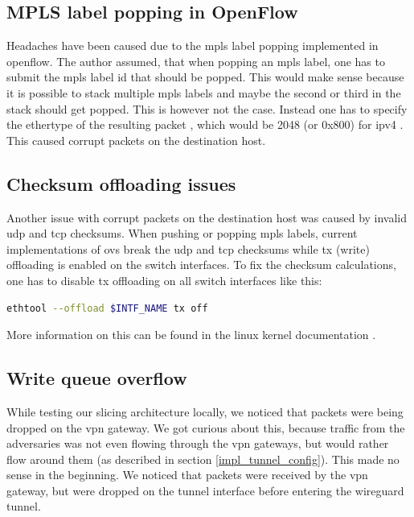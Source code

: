 \subsection{MPLS label popping in OpenFlow}
Headaches have been caused due to the \acrshort{mpls} label popping implemented in \Gls{openflow}. The author assumed, that when popping an \acrshort{mpls} label, one has to submit the \acrshort{mpls} label id that should be popped. This would make sense because it is possible to stack multiple \acrshort{mpls} labels and maybe the second or third in the stack should get popped. This is however not the case. Instead one has to specify the \gls{ethertype} of the resulting packet \cite{openflow}, which would be 2048 (or 0x800) for \acrshort{ipv4} \cite{rfc7042}. This caused corrupt packets on the destination host.

\subsection{Checksum offloading issues}
Another issue with corrupt packets on the destination host was caused by invalid \acrshort{udp} and \acrshort{tcp} checksums. When pushing or popping \acrshort{mpls} labels, current implementations of \Gls{ovs} break the \acrshort{udp} and \acrshort{tcp} checksums while \acrshort{tx} (write) offloading is enabled on the switch interfaces. To fix the checksum calculations, one has to disable \acrshort{tx} offloading on all switch interfaces like this:

\begin{lstlisting}[language=bash]
ethtool --offload $INTF_NAME tx off
\end{lstlisting}

More information on this can be found in the linux kernel documentation \cite{txoffload}.

\subsection{Write queue overflow}
While testing our slicing architecture locally, we noticed that packets were being dropped on the \acrshort{vpn} gateway. We got curious about this, because traffic from the adversaries was not even flowing through the \acrshort{vpn} gateways, but would rather flow around them (as described in section \ref{impl_tunnel_config}). This made no sense in the beginning. We noticed that packets were received by the \acrshort{vpn} gateway, but were dropped on the tunnel interface before entering the \gls{wireguard} tunnel.

